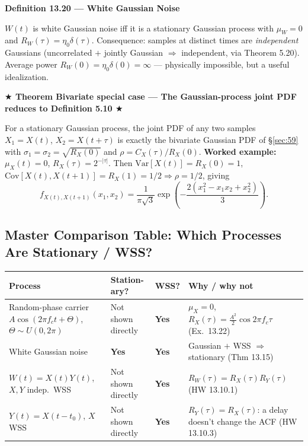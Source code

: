 \documentclass[11pt]{article}
\newcommand{\Var}[1]{\mathrm{Var}\left[#1\right]}
\newcommand{\Cov}[1]{\mathrm{Cov}\left[#1\right]}
\newcommand{\topline}[1]{\par\vspace{5pt}\noindent{\color{#1}\rule{\linewidth}{1.1pt}}\par\vspace{3pt}}
\newcommand{\botline}[1]{\par\vspace{2pt}\noindent{\color{#1}\rule{\linewidth}{1.1pt}}\par\vspace{8pt}}
\newenvironment{defbox}[2]{%
  \topline{defcol}\noindent\textbf{\color{defcol}Definition #1 --- #2}\par\smallskip\noindent\ignorespaces
}{\botline{defcol}}
\newenvironment{flagbox}[2]{%
  \topline{flagcol}\vspace{-9pt}\topline{flagcol}%
  \noindent\textbf{\color{flagcol}$\bigstar$ Theorem #1 --- #2 $\bigstar$ \; [PROFESSOR-FLAGGED --- MEMORIZE]}\par\smallskip\noindent\ignorespaces
}{\botline{flagcol}\vspace{-9pt}\botline{flagcol}}
\begin{document}
\begin{defbox}{13.20}{White Gaussian Noise}
$W(t)$ is white Gaussian noise iff it is a stationary Gaussian process with $\mu_W=0$ and
$R_W(\tau)=\eta_0\delta(\tau)$. Consequence: samples at distinct times are \emph{independent}
Gaussians (uncorrelated $+$ jointly Gaussian $\Rightarrow$ independent, via Theorem 5.20).
Average power $R_W(0)=\eta_0\delta(0)=\infty$ --- physically impossible, but a useful
idealization.
\end{defbox}

\begin{flagbox}{Bivariate special case}{The Gaussian-process joint PDF reduces to Definition 5.10}
For a stationary Gaussian process, the joint PDF of any two samples $X_1=X(t)$, $X_2=X(t+\tau)$
is exactly the bivariate Gaussian PDF of \S\ref{sec:59} with $\sigma_1=\sigma_2=\sqrt{R_X(0)}$
and $\rho = C_X(\tau)/R_X(0)$. \textbf{Worked example:} $\mu_X(t)=0$, $R_X(\tau)=2^{-|\tau|}$.
Then $\Var{X(t)}=R_X(0)=1$, $\Cov{X(t),X(t+1)}=R_X(1)=1/2\Rightarrow\rho=1/2$, giving
\[ f_{X(t),X(t+1)}(x_1,x_2) = \frac{1}{\pi\sqrt3}\exp\!\left(-\frac{2(x_1^2-x_1x_2+x_2^2)}{3}\right). \]
\end{flagbox}

\subsection{Master Comparison Table: Which Processes Are Stationary / WSS?}

\begin{center}
\small
\begin{tabular}{@{}p{3.4cm}p{1.9cm}p{1.1cm}p{6.2cm}@{}}
\toprule
\textbf{Process} & \textbf{Station-ary?} & \textbf{WSS?} & \textbf{Why / why not}\\
\midrule
Random-phase carrier $A\cos(2\pi f_ct+\Theta)$, $\Theta\sim U(0,2\pi)$ & Not shown directly & \textbf{Yes} & $\mu_X=0$, $R_X(\tau)=\tfrac{A^2}{2}\cos2\pi f_c\tau$ (Ex.\ 13.22)\\[4pt]
White Gaussian noise & \textbf{Yes} & \textbf{Yes} & Gaussian $+$ WSS $\Rightarrow$ stationary (Thm 13.15)\\[4pt]
$W(t)=X(t)Y(t)$, $X,Y$ indep.\ WSS & Not shown directly & \textbf{Yes} & $R_W(\tau)=R_X(\tau)R_Y(\tau)$ (HW 13.10.1)\\[4pt]
$Y(t)=X(t-t_0)$, $X$ WSS & Not shown directly & \textbf{Yes} & $R_Y(\tau)=R_X(\tau)$: a delay doesn't change the ACF (HW 13.10.3)\\
\bottomrule
\end{tabular}
\end{center}
\end{document}
